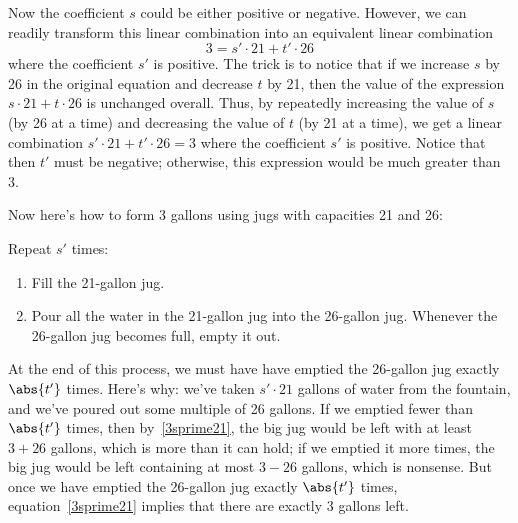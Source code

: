 Now the coefficient $s$ could be either positive or negative.
However, we can readily transform this linear combination into an
equivalent linear combination
%
\begin{equation}\label{3sprime21}
3 = s' \cdot 21 + t' \cdot 26
\end{equation}
%
where the coefficient $s'$ is positive.  The trick is to notice that
if we increase $s$ by 26 in the original equation and decrease $t$ by
21, then the value of the expression $s \cdot 21 + t \cdot 26$ is
unchanged overall.  Thus, by repeatedly increasing the value of $s$
(by 26 at a time) and decreasing the value of $t$ (by 21 at a time),
we get a linear combination $s' \cdot 21 + t' \cdot 26 = 3$ where the
coefficient $s'$ is positive.  Notice that then $t'$ must be negative;
otherwise, this expression would be much greater than 3.

Now here's how to form 3 gallons using jugs with capacities 21 and 26:

Repeat $s'$ times:
\begin{enumerate}
\item Fill the 21-gallon jug.
\item Pour all the water in the 21-gallon jug into the 26-gallon jug.
Whenever the 26-gallon jug becomes full, empty it out.
\end{enumerate}
%
At the end of this process, we must have have emptied the 26-gallon
jug exactly $\abs{t'}$ times.  Here's why: we've taken $s' \cdot 21$
gallons of water from the fountain, and we've poured out some multiple
of 26 gallons.  If we emptied fewer than $\abs{t'}$ times, then
by~\eqref{3sprime21}, the big jug would be left with at least $3+26$
gallons, which is more than it can hold; if we emptied it more times,
the big jug would be left containing at most $3-26$ gallons, which is
nonsense.  But once we have emptied the 26-gallon jug exactly
$\abs{t'}$ times, equation~\eqref{3sprime21} implies that there are
exactly 3 gallons left.

